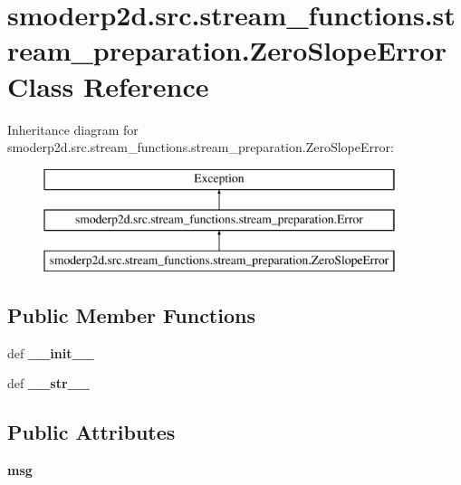 \hypertarget{classsmoderp2d_1_1src_1_1stream__functions_1_1stream__preparation_1_1ZeroSlopeError}{\section{smoderp2d.\-src.\-stream\-\_\-functions.\-stream\-\_\-preparation.\-Zero\-Slope\-Error Class Reference}
\label{classsmoderp2d_1_1src_1_1stream__functions_1_1stream__preparation_1_1ZeroSlopeError}
}
Inheritance diagram for smoderp2d.\-src.\-stream\-\_\-functions.\-stream\-\_\-preparation.\-Zero\-Slope\-Error\-:\begin{figure}[H]
\begin{center}
\leavevmode
\includegraphics[height=3.000000cm]{classsmoderp2d_1_1src_1_1stream__functions_1_1stream__preparation_1_1ZeroSlopeError}
\end{center}
\end{figure}
\subsection*{Public Member Functions}
\begin{DoxyCompactItemize}
\item 
\hypertarget{classsmoderp2d_1_1src_1_1stream__functions_1_1stream__preparation_1_1ZeroSlopeError_ac2efe0eada14a4d9333fc44640e1a71d}{def {\bfseries \-\_\-\-\_\-init\-\_\-\-\_\-}}\label{classsmoderp2d_1_1src_1_1stream__functions_1_1stream__preparation_1_1ZeroSlopeError_ac2efe0eada14a4d9333fc44640e1a71d}

\item 
\hypertarget{classsmoderp2d_1_1src_1_1stream__functions_1_1stream__preparation_1_1ZeroSlopeError_a6f2e5c2a0a2d320a5dc9d4f5cfdcdb34}{def {\bfseries \-\_\-\-\_\-str\-\_\-\-\_\-}}\label{classsmoderp2d_1_1src_1_1stream__functions_1_1stream__preparation_1_1ZeroSlopeError_a6f2e5c2a0a2d320a5dc9d4f5cfdcdb34}

\end{DoxyCompactItemize}
\subsection*{Public Attributes}
\begin{DoxyCompactItemize}
\item 
\hypertarget{classsmoderp2d_1_1src_1_1stream__functions_1_1stream__preparation_1_1ZeroSlopeError_ab41f8e7b39300db9de9b662eee2740be}{{\bfseries msg}}\label{classsmoderp2d_1_1src_1_1stream__functions_1_1stream__preparation_1_1ZeroSlopeError_ab41f8e7b39300db9de9b662eee2740be}

\end{DoxyCompactItemize}


